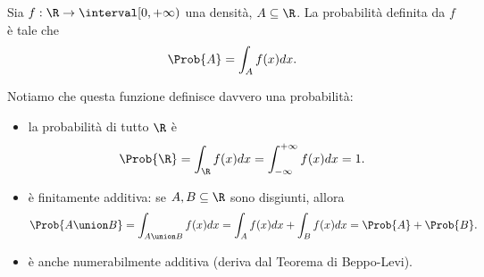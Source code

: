 \begin{definition}
    Sia $f : \R \to \interval[{0, +\infty})$ una densità, $A \subseteq \R$. La probabilità definita da $f$ è tale che \[
        \Prob{A} = \int_{A} f(x)dx.    
    \]
\end{definition}

Notiamo che questa funzione definisce davvero una probabilità:
\begin{itemize}
    \item la probabilità di tutto $\R$ è \[
        \Prob{\R} = \int_\R f(x)dx = \int_{-\infty}^{+\infty} f(x)dx = 1.    
    \]
    \item è finitamente additiva: se $A, B \subseteq \R$ sono disgiunti, allora \[
        \Prob{A \union B} = \int_{A \union B} f(x)dx = \int_A f(x)dx + \int_B f(x)dx = \Prob{A} + \Prob{B}.    
    \]
    \item è anche numerabilmente additiva (deriva dal Teorema di Beppo-Levi).
\end{itemize}

